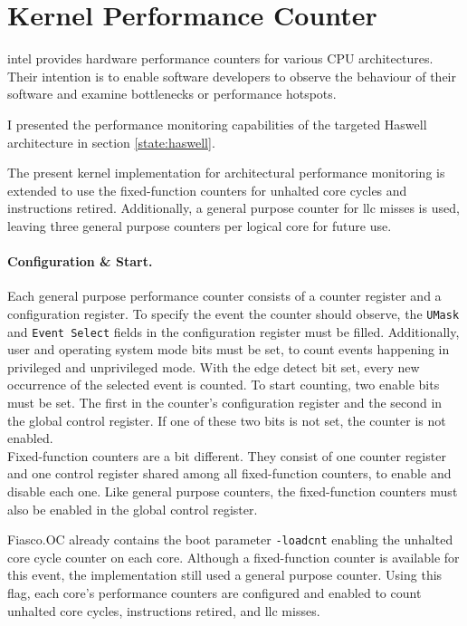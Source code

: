 \section{Kernel Performance Counter}
\label{impl:perfcounter}

\gls{intel} provides hardware performance counters for various CPU
architectures.
Their intention is to enable software developers to observe the behaviour of
their software and examine bottlenecks or performance hotspots.

I presented the performance monitoring capabilities of the targeted Haswell
architecture in section \ref{state:haswell}.

The present kernel implementation for architectural performance monitoring is
extended to use the fixed-function counters for unhalted core cycles and
instructions retired.
Additionally, a general purpose counter for \gls{llc} misses is used,
leaving three general purpose counters per logical core for future use.

\paragraph{Configuration \& Start.}
Each general purpose performance counter consists of a counter register and a
configuration register.
To specify the event the counter should observe, the \texttt{UMask} and
\texttt{Event Select} fields in the configuration register must be filled.
Additionally, user and operating system mode bits must be set, to count events
happening in privileged and unprivileged mode.
With the edge detect bit set, every new occurrence of the selected event is
counted.
To start counting, two enable bits must be set.
The first in the counter's configuration register and the second in the global
control register.
If one of these two bits is not set, the counter is not enabled.
\\

Fixed-function counters are a bit different.
They consist of one counter register and one control register shared among all
fixed-function counters, to enable and disable each one.
Like general purpose counters, the fixed-function counters must also be enabled
in the global control register.

Fiasco.OC already contains the boot parameter \texttt{-loadcnt} enabling the
unhalted core cycle counter on each core.
Although a fixed-function counter is available for this event, the
implementation still used a general purpose counter.
Using this flag, each core's performance counters are configured and enabled to
count unhalted core cycles, instructions retired, and \gls{llc} misses.


